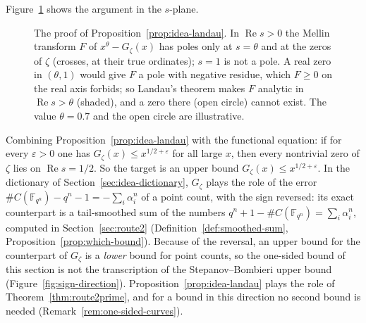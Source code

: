 \documentclass[11pt]{amsbook}
\theoremstyle{plain}
\theoremstyle{definition}
\theoremstyle{remark}
\numberwithin{equation}{section}
\numberwithin{figure}{chapter}
\numberwithin{table}{chapter}
\newcommand{\F}{\mathbb{F}}
\newcommand{\Gz}{G_{\zeta}}
\begin{document}
Figure~\ref{fig:landau-plane} shows the argument in the $s$-plane.
\begin{figure}[tbp]
\centering
{}
\caption{The proof of Proposition~\ref{prop:idea-landau}. In
$\operatorname{Re}s>0$ the Mellin transform $F$ of
$x^\theta-\Gz(x)$ has poles only at $s=\theta$ and at the zeros of
$\zeta$ (crosses, at their true ordinates); $s=1$ is not a pole.
A real zero in $(\theta,1)$ would give $F$ a pole with negative
residue, which $F\ge0$ on the real axis forbids; so Landau's theorem
makes $F$ analytic in $\operatorname{Re}s>\theta$ (shaded), and a
zero there (open circle) cannot exist. The value $\theta=0.7$ and the
open circle are illustrative.}
\label{fig:landau-plane}
\end{figure}

Combining Proposition~\ref{prop:idea-landau} with the functional
equation: if for every $\varepsilon > 0$ one has
$\Gz(x) \le x^{1/2 + \varepsilon}$ for all large $x$, then every
nontrivial zero of $\zeta$ lies on $\operatorname{Re} s = 1/2$. So
the target is an upper bound $\Gz(x) \le x^{1/2+\varepsilon}$. In
the dictionary of Section~\ref{sec:idea-dictionary}, $\Gz$ plays the
role of the error $\#C(\F_{q^n}) - q^n - 1 = -\sum_i \alpha_i^n$ of
a point count, with the sign reversed: its exact counterpart is a
tail-smoothed sum of the numbers
$q^n + 1 - \#C(\F_{q^n}) = \sum_i\alpha_i^n$, computed in
Section~\ref{sec:route2}
(Definition~\ref{def:smoothed-sum},
Proposition~\ref{prop:which-bound}). Because of the reversal, an
upper bound for the counterpart of $\Gz$ is a
\emph{lower} bound for point counts, so the one-sided bound of
this section is not the transcription of the Stepanov--Bombieri
upper bound (Figure~\ref{fig:sign-direction}). Proposition~\ref{prop:idea-landau} plays the role of
Theorem~\ref{thm:route2prime}, and for a bound in this direction no
second bound is needed (Remark~\ref{rem:one-sided-curves}).
\begin{figure}[tbp]
\centering

\end{figure}
\end{document}
